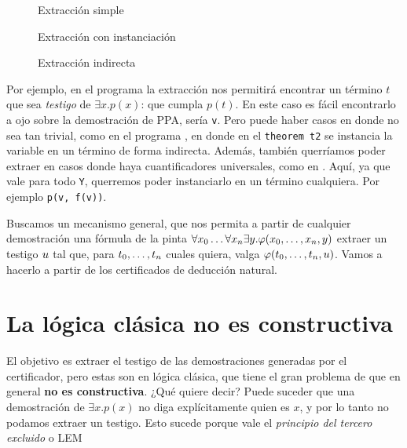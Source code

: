 \begin{multicols}{2}
    \begin{figure}[H]
        
        \caption{Extracción simple}
        \label{fri:prog:exists}
    \end{figure}

    \begin{figure}[H]
        
        \caption{Extracción con instanciación}
        \label{fri:prog:forall}
    \end{figure}
    \begin{figure}[H]
        
        \caption{Extracción indirecta}
        \label{fri:prog:indirect}
    \end{figure}
\end{multicols}

Por ejemplo, en el programa  la extracción nos
permitirá encontrar un término $t$ que sea \textit{testigo} de $\exists x. p(x)$: que cumpla $p(t)$. En este caso es fácil encontrarlo a ojo sobre la
demostración de PPA, sería \lstinline{v}. Pero puede haber casos en donde no sea
tan trivial, como en el programa , en donde en el
\lstinline{theorem t2} se instancia la variable en un término de forma
indirecta. Además, también querríamos poder extraer en casos donde haya
cuantificadores universales, como en . Aquí, ya que vale para todo \lstinline{Y}, querremos poder instanciarlo en un término cualquiera. Por ejemplo \lstinline{p(v, f(v))}.

Buscamos un mecanismo general, que nos permita a partir de cualquier
demostración una fórmula de la pinta $\forall x_0 \dots \forall x_n
\exists y . \varphi(x_0, \dots, x_n, y)$ extraer un testigo $u$ tal que, para $t_0, \dots, t_n$ cuales quiera, valga $\varphi(t_0, \dots, t_n, u)$. Vamos a hacerlo a partir
de los certificados de deducción natural.

\section{La lógica clásica no es constructiva}

El objetivo es extraer el testigo de las demostraciones generadas por el
certificador, pero estas son en lógica clásica, que tiene el gran problema de
que en general \textbf{no es constructiva}. ¿Qué quiere decir? Puede suceder que
una demostración de $\exists x . p(x)$ no diga explícitamente quien es $x$, y
por lo tanto no podamos extraer un testigo. Esto sucede porque vale el \textit{principio del tercero excluido} o LEM

